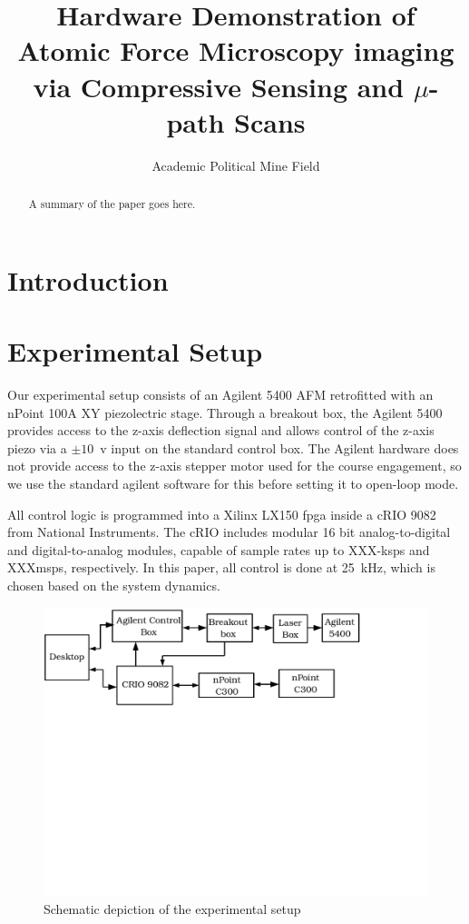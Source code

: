 \documentclass[letterpaper, 10 pt, conference]{ieeeconf}  %
\title{Hardware Demonstration of Atomic Force Microscopy imaging via Compressive Sensing and $\mu$-path Scans}
\author{Academic Political Mine Field }
\date{\parbox{\linewidth}{\centering%
\endgraf\bigskip
SOME project }}
\begin{document}
\maketitle
\begin{abstract}A summary of the paper goes here.
\end{abstract}
\section{Introduction}

\section{Experimental Setup}
Our experimental setup consists of an Agilent 5400 AFM retrofitted with an nPoint 100A XY piezolectric stage. Through a breakout box, the Agilent 5400 provides access to the z-axis deflection signal and allows control of the z-axis piezo via a $\pm10$~v input on the standard control box. The Agilent hardware does not provide access to the z-axis stepper motor used for the course engagement, so we use the standard agilent software for this before setting it to open-loop mode.

All control logic is programmed into a Xilinx LX150 fpga inside a cRIO 9082 from National Instruments. The cRIO includes modular 16 bit analog-to-digital and digital-to-analog modules, capable of sample rates up to XXX-ksps and XXXmsps, respectively. In this paper, all control is done at 25~kHz, which is chosen based on the system dynamics.
\begin{figure}
  \includegraphics[trim=-00 350 0 0, clip,scale = .35]{figures/exp_setup}
  \caption{Schematic depiction of the experimental setup}
\end{figure}
\end{document}
